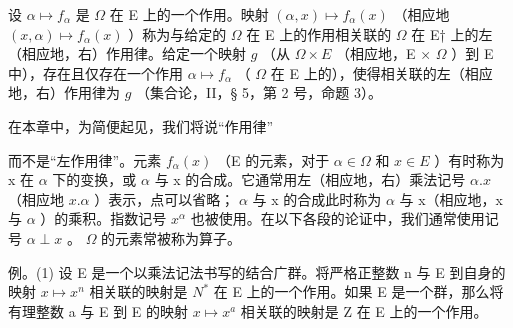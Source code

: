 设 \(\alpha \mapsto f_{\alpha}\) 是 \(\Omega\) 在 E 上的一个作用。映射 \((\alpha, x) \mapsto f_{\alpha}(x)\) （相应地 \((x, \alpha) \mapsto f_{\alpha}(x)\) ）称为与给定的 \(\Omega\) 在 E 上的作用相关联的 \(\Omega\) 在 E† 上的左（相应地，右）作用律。给定一个映射 \(g\) （从 \(\Omega \times E\) （相应地，E × \(\Omega\) ）到 E 中），存在且仅存在一个作用 \(\alpha \mapsto f_{\alpha}\) （ \(\Omega\) 在 E 上的），使得相关联的左（相应地，右）作用律为 \(g\) （集合论，II，§ 5，第 2 号，命题 3）。

在本章中，为简便起见，我们将说“作用律”

而不是“左作用律”。元素 \(f_{\alpha}(x)\) （E 的元素，对于 \(\alpha \in \Omega\) 和 \(x \in E\) ）有时称为 x 在 \(\alpha\) 下的变换，或 \(\alpha\) 与 x 的合成。它通常用左（相应地，右）乘法记号 \(\alpha.x\) （相应地 \(x.\alpha\) ）表示，点可以省略； \(\alpha\) 与 x 的合成此时称为 \(\alpha\) 与 x（相应地，x 与 \(\alpha\) ）的乘积。指数记号 \(x^{\alpha}\) 也被使用。在以下各段的论证中，我们通常使用记号 \(\alpha \perp x\) 。 \(\Omega\) 的元素常被称为算子。

例。(1) 设 E 是一个以乘法记法书写的结合广群。将严格正整数 n 与 E 到自身的映射 \(x \mapsto x^{n}\) 相关联的映射是 \(N^{*}\) 在 E 上的一个作用。如果 E 是一个群，那么将有理整数 a 与 E 到 E 的映射 \(x \mapsto x^{a}\) 相关联的映射是 Z 在 E 上的一个作用。

